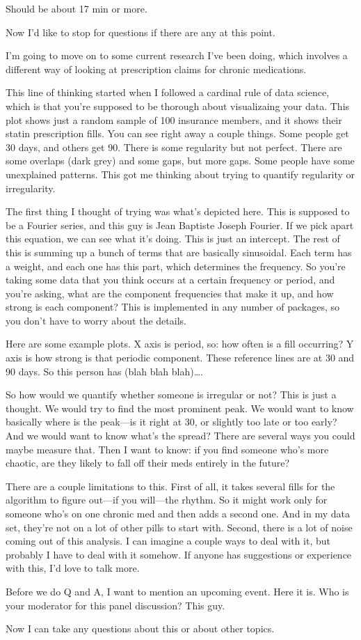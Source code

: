 \documentclass[12pt]{report}
\begin{document}
Should be about 17 min or more.

\begin{large}

Now I'd like to stop for questions if there are any at this point.

I'm going to move on to some current research I've been doing, which
involves a different way of looking at prescription claims for chronic
medications.

This line of thinking started when I followed a cardinal rule of data
science, which is that you're supposed to be thorough about
visualizaing your data. This plot shows just a random sample of 100
insurance members, and it shows their statin prescription fills. You
can see right away a couple things. Some people get 30 days, and
others get 90. There is some regularity but not perfect. There are
some overlaps (dark grey) and some gaps, but more gaps. Some people
have some unexplained patterns. This got me thinking about trying to
quantify regularity or irregularity.

The first thing I thought of trying was what's depicted here. This is
supposed to be a Fourier series, and this guy is Jean Baptiste Joseph
Fourier. If we pick apart this equation, we can see what it's doing.
This is just an intercept. The rest of this is summing up a bunch of
terms that are basically sinusoidal. Each term has a weight, and each
one has this part, which determines the frequency. So you're taking
some data that you think occurs at a certain frequency or period, and
you're asking, what are the component frequencies that make it up, and
how strong is each component? This is implemented in any number of
packages, so you don't have to worry about the details.

Here are some example plots. X axis is period, so: how often is a fill
occurring? Y axis is how strong is that periodic component. These
reference lines are at 30 and 90 days. So this person has (blah blah
blah)\ldots.

So how would we quantify whether someone is irregular or not? This is
just a thought. We would try to find the most prominent peak. We would
want to know basically where is the peak---is it right at 30, or
slightly too late or too early? And we would want to know what's the
spread? There are several ways you could maybe measure that. Then I
want to know: if you find someone who's more chaotic, are they likely
to fall off their meds entirely in the future?

There are a couple limitations to this. First of all, it takes several
fills for the algorithm to figure out---if you will---the rhythm. So
it might work only for someone who's on one chronic med and then adds a
second one. And in my data set, they're not on a lot of other pills to
start with. Second, there is a lot of noise coming out of this
analysis. I can imagine a couple ways to deal with it, but probably I
have to deal with it somehow. If anyone has suggestions or experience
with this, I'd love to talk more.

Before we do Q and A, I want to mention an upcoming event. Here it is.
Who is your moderator for this panel discussion? This guy.

Now I can take any questions about this or about other topics.

\end{large}
\end{document}
